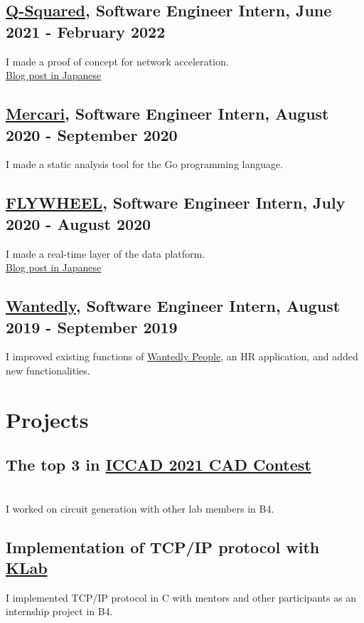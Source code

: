 \documentclass[12pt]{article}
\begin{document}
  \subsection*{\href{https://q-squared.jp}{Q-Squared}, Software Engineer Intern, June 2021 - February 2022}
    I made a proof of concept for network acceleration.
    \\
    \href{https://flossy-era-126.notion.site/DPDK-Potential-in-Finance-840b0d289273495192eb04d97d268eeb}{Blog post in Japanese}
  \subsection*{\href{https://about.mercari.com/en}{Mercari}, Software Engineer Intern, August 2020 - September 2020}
    I made a static analysis tool for the Go programming language.
  \subsection*{\href{https://www.flywheel.jp}{FLYWHEEL}, Software Engineer Intern, July 2020 - August 2020}
    I made a real-time layer of the data platform.
    \\
    \href{https://www.flywheel.jp/topics/20200917}{Blog post in Japanese}
  \subsection*{\href{https://wantedlyinc.com/ja}{Wantedly}, Software Engineer Intern, August 2019 - September 2019}
    I improved existing functions of \href{https://people.wantedly.com/}{Wantedly People}, an HR application, and added new functionalities.

\section*{Projects}
  \subsection*{The top 3 in \href{http://iccad-contest.org/2021/}{ICCAD 2021 CAD Contest}}
    \\
    I worked on circuit generation with other lab members in B4.
  \subsection*{Implementation of TCP/IP protocol with \href{https://www.klab.com/en/}{KLab}}
    I implemented TCP/IP protocol in C with mentors and other participants as an internship project in B4.
\end{document}

